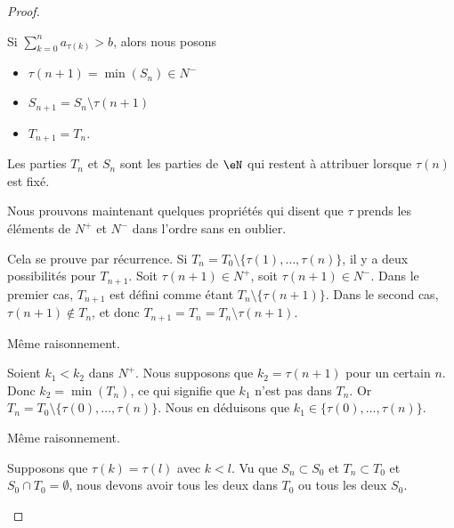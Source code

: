 \begin{proof}
\begin{subproof}
		Si \( \sum_{k=0}^na_{\tau(k)}>b\), alors nous posons
		\begin{itemize}
			\item
			      \( \tau(n+1)=\min(S_n)\in N^-\)
			\item
			      \( S_{n+1}=S_n\setminus\tau(n+1)\)
			\item
			      \( T_{n+1}=T_n\).
		\end{itemize}
		Les parties \( T_n\) et \( S_n\) sont les parties de \( \eN\) qui restent à attribuer lorsque \( \tau(n)\) est fixé.

		Nous prouvons maintenant quelques propriétés qui disent que \( \tau\) prends les éléments de \( N^+\) et \( N^-\) dans l'ordre sans en oublier.

		\spitem[\( T_n=T_0\setminus\tau\{ 0,\ldots,n \}\)]		\label{ITEMooLBLUooYypSZd}

		Cela se prouve par récurrence. Si \( T_n=T_0\setminus \{ \tau(1),\ldots,\tau(n) \}\), il y a deux possibilités pour \( T_{n+1}\). Soit \( \tau(n+1)\in N^+\), soit \( \tau(n+1)\in N^-\). Dans le premier cas, \( T_{n+1}\) est défini comme étant \( T_n\setminus\{ \tau(n+1) \}\). Dans le second cas, \( \tau(n+1)\not\in T_n\), et donc \( T_{n+1}=T_n=T_n\setminus\tau(n+1)\).

		\spitem[\( S_n=S_0\setminus\tau\{ 0,\ldots,n \}\)]

		Même raisonnement.


		Soient \( k_1<k_2\) dans \( N^+\). Nous supposons que \( k_2=\tau(n+1 )\) pour un certain \( n\). Donc \( k_2=\min(T_n)\), ce qui signifie que \( k_1\) n'est pas dans \( T_n\). Or \( T_n=T_0\setminus\{ \tau(0),\ldots,\tau(n) \}\). Nous en déduisons que \( k_1\in \{ \tau(0),\ldots,\tau(n) \}\).


		Même raisonnement.

		Supposons que \( \tau(k)=\tau(l)\) avec \( k<l\). Vu que \( S_n\subset S_0\) et \( T_n\subset T_0\) et \( S_0\cap T_0=\emptyset\), nous devons avoir tous les deux dans \( T_0\) ou tous les deux \( S_0\).


\end{subproof}
\end{proof}
